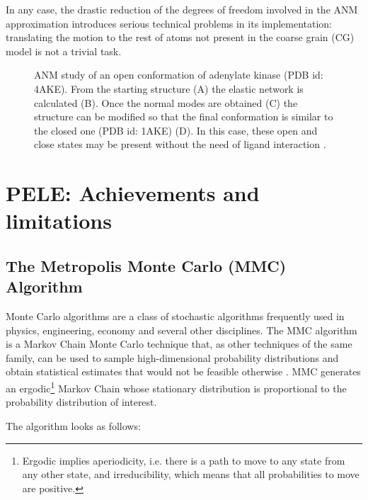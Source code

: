 In any case, the drastic reduction of the degrees of freedom involved in the ANM approximation introduces serious technical problems in its implementation: translating the motion to the rest of atoms not present in the coarse grain (CG) model is not a trivial task. 


\begin{sidewaysfigure}
\caption{ANM study of an open conformation of adenylate kinase (PDB id: 4AKE). From the starting structure (A) the elastic network is calculated (B). Once the normal modes are obtained (C) the structure can be modified so that the final conformation is similar to the closed one (PDB id: 1AKE) (D). In this case, these open and close states may be present without the need of ligand interaction \cite{lee_atomistic_2015}.}
\label{fig:anm_4ake_app}
\end{sidewaysfigure}

\section{PELE: Achievements and limitations}

\subsection{The Metropolis Monte Carlo (MMC) Algorithm}

Monte Carlo algorithms are a class of stochastic algorithms  frequently used in physics, engineering, economy and several other disciplines. The MMC \cite{metropolis_equation_1953} algorithm is a Markov Chain Monte Carlo technique that, as other techniques of the same family, can be used to sample high-dimensional probability distributions and obtain statistical estimates that would not be feasible otherwise \cite{jorgensen_monte_1996}. MMC generates an ergodic\footnote{ Ergodic implies aperiodicity, i.e. there is a path to move to any state from any other state, and irreducibility, which means that all probabilities to move are positive.} Markov Chain whose stationary distribution is proportional to the probability distribution of interest. 

The algorithm looks as follows:

